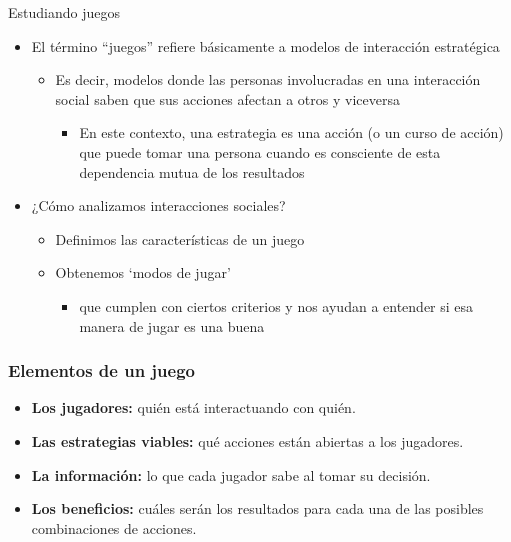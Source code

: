 \documentclass{beamer}
\begin{document}
\begin{frame}{Estudiando juegos}
    \begin{itemize}
        \item El término ``juegos'' refiere básicamente a modelos de interacción estratégica
        \begin{itemize}
            \item Es decir, modelos donde las personas involucradas en una interacción social saben que sus acciones afectan a otros y viceversa
            \begin{itemize}
                \item En este contexto, una estrategia es una acción (o un curso de acción) que puede tomar una persona cuando es consciente de esta dependencia mutua de los resultados
            \end{itemize}
        \end{itemize}
        \item ¿Cómo analizamos interacciones sociales?
        \begin{itemize}
            \item Definimos las características de un juego
            \item Obtenemos ‘modos de jugar’
            \begin{itemize}
                \item que cumplen con ciertos criterios y nos ayudan a entender si esa manera de jugar es una buena
            \end{itemize}
        \end{itemize}
    \end{itemize}
\end{frame}

\begin{frame}
    \frametitle{Elementos de un juego}
    \begin{itemize}
        \item \textbf{Los jugadores:} quién está interactuando con quién.\vspace{4mm}
        \item \textbf{Las estrategias viables:} qué acciones están abiertas a los jugadores.\vspace{4mm}
        \item \textbf{La información:} lo que cada jugador sabe al tomar su decisión.\vspace{4mm}
        \item \textbf{Los beneficios:} cuáles serán los resultados para cada una de las posibles combinaciones de acciones.\vspace{4mm}
    \end{itemize}
\end{frame}
\end{document}
